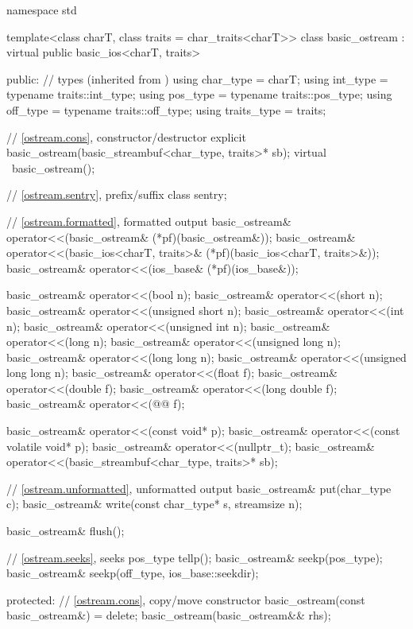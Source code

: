 %
\begin{codeblock}
namespace std {
  template<class charT, class traits = char_traits<charT>>
  class basic_ostream : virtual public basic_ios<charT, traits> {
  public:
    // types (inherited from )
    using char_type   = charT;
    using int_type    = typename traits::int_type;
    using pos_type    = typename traits::pos_type;
    using off_type    = typename traits::off_type;
    using traits_type = traits;

    // \ref{ostream.cons}, constructor/destructor
    explicit basic_ostream(basic_streambuf<char_type, traits>* sb);
    virtual ~basic_ostream();

    // \ref{ostream.sentry}, prefix/suffix
    class sentry;

    // \ref{ostream.formatted}, formatted output
    basic_ostream& operator<<(basic_ostream& (*pf)(basic_ostream&));
    basic_ostream& operator<<(basic_ios<charT, traits>& (*pf)(basic_ios<charT, traits>&));
    basic_ostream& operator<<(ios_base& (*pf)(ios_base&));

    basic_ostream& operator<<(bool n);
    basic_ostream& operator<<(short n);
    basic_ostream& operator<<(unsigned short n);
    basic_ostream& operator<<(int n);
    basic_ostream& operator<<(unsigned int n);
    basic_ostream& operator<<(long n);
    basic_ostream& operator<<(unsigned long n);
    basic_ostream& operator<<(long long n);
    basic_ostream& operator<<(unsigned long long n);
    basic_ostream& operator<<(float f);
    basic_ostream& operator<<(double f);
    basic_ostream& operator<<(long double f);
    basic_ostream& operator<<(@@ f);

    basic_ostream& operator<<(const void* p);
    basic_ostream& operator<<(const volatile void* p);
    basic_ostream& operator<<(nullptr_t);
    basic_ostream& operator<<(basic_streambuf<char_type, traits>* sb);

    // \ref{ostream.unformatted}, unformatted output
    basic_ostream& put(char_type c);
    basic_ostream& write(const char_type* s, streamsize n);

    basic_ostream& flush();

    // \ref{ostream.seeks}, seeks
    pos_type tellp();
    basic_ostream& seekp(pos_type);
    basic_ostream& seekp(off_type, ios_base::seekdir);

  protected:
    // \ref{ostream.cons}, copy/move constructor
    basic_ostream(const basic_ostream&) = delete;
    basic_ostream(basic_ostream&& rhs);

}}
\end{codeblock}
